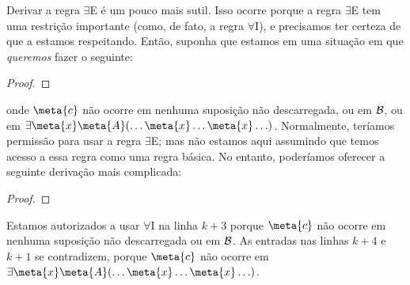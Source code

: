 Derivar a regra $\exists$E é um pouco mais sutil. Isso ocorre porque a regra $\exists$E tem uma restrição importante (como, de fato, a regra $\forall$I), e precisamos ter certeza de que a estamos respeitando. Então, suponha que estamos em uma situação em que \emph{queremos} fazer o seguinte: 

\begin{proof}
	\open
	\close
\end{proof}\noindent

onde $\meta{c}$ não ocorre em nenhuma suposição não descarregada, ou em $\mathcal{B}$, ou em $\exists \meta{x} \meta{A}(\ldots \meta{x} \ldots \meta{x}\ldots)$. Normalmente, teríamos permissão para usar a regra $\exists$E; mas não estamos aqui assumindo que temos acesso a essa regra como uma regra básica. No entanto, poderíamos oferecer a seguinte derivação mais complicada:
 
\begin{proof}
	\open
	\close
	\open
	\close
\end{proof}\noindent

Estamos autorizados a usar $\forall$I na linha $k+3$ porque $\meta{c}$ não ocorre em nenhuma suposição não descarregada ou em $\mathcal{B}$. As entradas nas linhas $k+4$ e $k+1$ se contradizem, porque $\meta{c}$ não ocorre em $\exists \meta{x} \meta{A} (\ldots \meta{x} \ldots \meta{x} \ldots)$.

